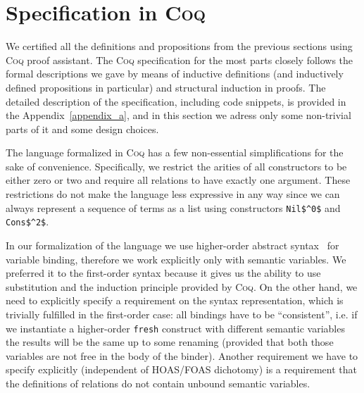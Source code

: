 \section{Specification in \textsc{Coq}}
\label{specification}

We certified all the definitions and propositions from the previous sections using \textsc{Coq} proof assistant. The \textsc{Coq} specification for the most parts closely follows the formal descriptions we gave by means of inductive definitions (and inductively defined propositions in particular) and structural induction in proofs. The detailed description of the specification, including code snippets, is provided in the Appendix~\ref{appendix_a}, and in this section we adress only some non-trivial parts of it and some design choices.

The language formalized in \textsc{Coq} has a few non-essential simplifications for the sake of convenience. Specifically, we restrict the arities of all constructors to be either zero or two and require all relations to have exactly one argument. These restrictions do not make the language less expressive in any way since we can always represent a sequence of terms as a list using constructors \lstinline|Nil$^0$| and \lstinline|Cons$^2$|. 

In our formalization of the language we use higher-order abstract syntax~\cite{HOAS} for variable binding, therefore we work explicitly only with semantic variables. We preferred it to the first-order syntax because it gives us the ability to use substitution and the induction principle provided by \textsc{Coq}. On the other hand, we need to explicitly specify a requirement on the syntax representation, which is trivially fulfilled in the first-order case: all bindings have to be ``consistent'', i.e. if we instantiate a higher-order \lstinline|fresh| construct with different semantic variables the results will be the same up to some renaming (provided that both those variables are not free in the body of the binder). Another requirement we have to specify explicitly (independent of HOAS/FOAS dichotomy) is a requirement that the definitions of relations do not contain unbound semantic variables.

